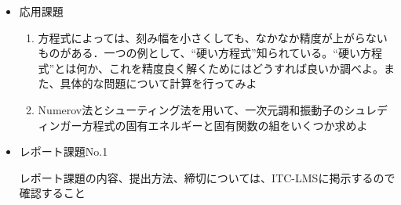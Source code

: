 \documentclass[11pt]{jarticle}
\begin{document}
\begin{itemize}
\item 応用課題
  \begin{enumerate}
  \item 方程式によっては、刻み幅を小さくしても、なかなか精度が上がらないものがある．一つの例として、``硬い方程式''知られている。``硬い方程式''とは何か、これを精度良く解くためにはどうすれば良いか調べよ。また、具体的な問題について計算を行ってみよ
  \item Numerov法とシューティング法を用いて、一次元調和振動子のシュレディンガー方程式の固有エネルギーと固有関数の組をいくつか求めよ
  \end{enumerate}

\item レポート課題No.1

  レポート課題の内容、提出方法、締切については、ITC-LMSに掲示するので確認すること

\end{itemize}
\end{document}
